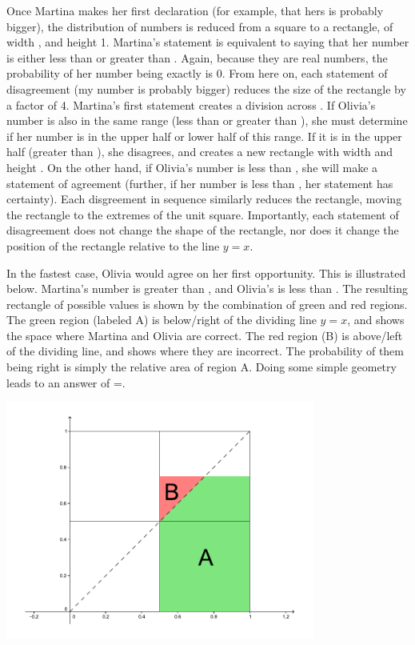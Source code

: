 \documentclass{article}
\begin{document}
Once Martina makes her first declaration (for example, that hers is probably bigger), the distribution of numbers is reduced from a square to a rectangle, of width , and height 1.
Martina's statement is equivalent to saying that her number is either less than or greater than .
Again, because they are real numbers, the probability of her number being exactly  is 0.
From here on, each statement of disagreement (my number is probably bigger) reduces the size of the rectangle by a factor of 4.
Martina's first statement creates a division across .
If Olivia's number is also in the same range (less than or greater than ), she must determine if her number is in the upper half or lower half of this range.
If it is in the upper half (greater than ), she disagrees, and creates a new rectangle with width  and height .
On the other hand, if Olivia's number is less than , she will make a statement of agreement (further, if her number is less than , her statement has certainty).
Each disgreement in sequence similarly reduces the rectangle, moving the rectangle to the extremes of the unit square.
Importantly, each statement of disagreement does not change the shape of the rectangle, nor does it change the position of the rectangle relative to the line $y=x$.

In the fastest case, Olivia would agree on her first opportunity.
This is illustrated below.
Martina's number is greater than , and Olivia's is less than .
The resulting rectangle of possible values is shown by the combination of green and red regions.
The green region (labeled A) is below/right of the dividing line $y=x$, and shows the space where Martina and Olivia are correct.
The red region (B) is above/left of the dividing line, and shows where they are incorrect.
The probability of them being right is simply the relative area of region A.
Doing some simple geometry leads to an answer of =.

\begin{center}
\includegraphics[width=4in]{Grid.pdf}
\end{center}
\vspace{0.1in}
\end{document}
